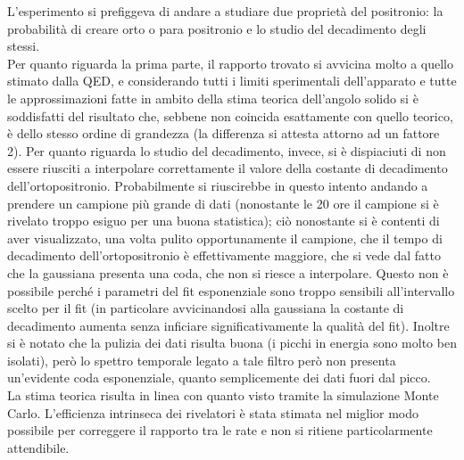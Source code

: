 L'esperimento si prefiggeva di andare a studiare due proprietà del positronio: la probabilità di creare orto o para positronio e lo studio del decadimento degli stessi.\\

Per quanto riguarda la prima parte, il rapporto trovato si avvicina molto a quello stimato dalla QED, e considerando tutti i limiti
sperimentali dell'apparato e tutte le approssimazioni fatte in ambito della stima teorica dell'angolo solido si è soddisfatti del risultato che, sebbene non coincida esattamente con quello teorico, è dello stesso ordine di grandezza (la differenza si attesta attorno ad un fattore 2). Per quanto riguarda lo
studio del decadimento, invece, si è dispiaciuti di non essere riusciti a interpolare correttamente il valore della costante di decadimento dell'ortopositronio. Probabilmente
si riuscirebbe in questo intento andando a prendere un campione più grande di dati (nonostante le 20 ore il campione si è rivelato troppo esiguo per una buona statistica);
ciò nonostante si è contenti di aver visualizzato, una volta pulito opportunamente il campione, che il tempo di decadimento dell'ortopositronio è effettivamente maggiore, che si vede dal fatto che la gaussiana presenta una coda, che non si riesce a interpolare. Questo non è possibile perché i parametri del fit esponenziale
sono troppo sensibili all'intervallo scelto per il fit (in particolare avvicinandosi alla gaussiana la costante di decadimento aumenta senza inficiare  significativamente la qualità del fit). Inoltre si è notato che la pulizia dei dati risulta buona (i picchi in energia sono molto ben isolati), però lo spettro temporale legato a tale filtro però non presenta un'evidente coda esponenziale, quanto semplicemente dei dati fuori dal picco.\\

La stima teorica risulta in linea con quanto visto tramite la simulazione Monte Carlo. L'efficienza intrinseca dei rivelatori è stata stimata nel miglior modo possibile per correggere il rapporto tra le rate e non si ritiene particolarmente attendibile.
